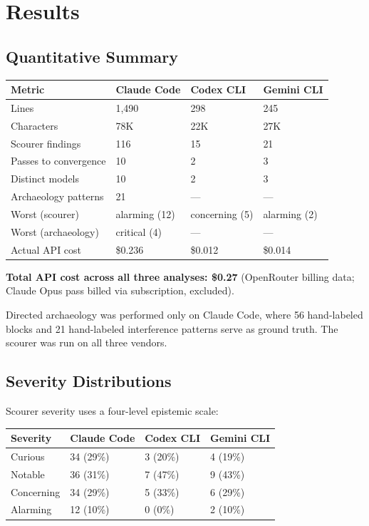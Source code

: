\section{Results}

\subsection{Quantitative Summary}

\begin{table}[t]
\small
\begin{tabular}{@{}llll@{}}
\toprule
Metric & Claude Code & Codex CLI & Gemini CLI \\
\midrule
Lines & 1,490 & 298 & 245 \\
Characters & 78K & 22K & 27K \\
Scourer findings & 116 & 15 & 21 \\
Passes to convergence & 10 & 2 & 3 \\
Distinct models & 10 & 2 & 3 \\
Archaeology patterns & 21 & --- & --- \\
Worst (scourer) & alarming (12) & concerning (5) & alarming (2) \\
Worst (archaeology) & critical (4) & --- & --- \\
Actual API cost & \$0.236 & \$0.012 & \$0.014 \\
\bottomrule
\end{tabular}
\end{table}

\textbf{Total API cost across all three analyses: \$0.27} (OpenRouter
billing data; Claude Opus pass billed via subscription, excluded).

Directed archaeology was performed only on Claude Code, where 56
hand-labeled blocks and 21 hand-labeled interference patterns serve as
ground truth. The scourer was run on all three vendors.

\subsection{Severity Distributions}

Scourer severity uses a four-level epistemic scale:

\begin{table}[t]
\small
\begin{tabular}{@{}llll@{}}
\toprule
Severity & Claude Code & Codex CLI & Gemini CLI \\
\midrule
Curious & 34 (29\%) & 3 (20\%) & 4 (19\%) \\
Notable & 36 (31\%) & 7 (47\%) & 9 (43\%) \\
Concerning & 34 (29\%) & 5 (33\%) & 6 (29\%) \\
Alarming & 12 (10\%) & 0 (0\%) & 2 (10\%) \\
\bottomrule
\end{tabular}
\end{table}


